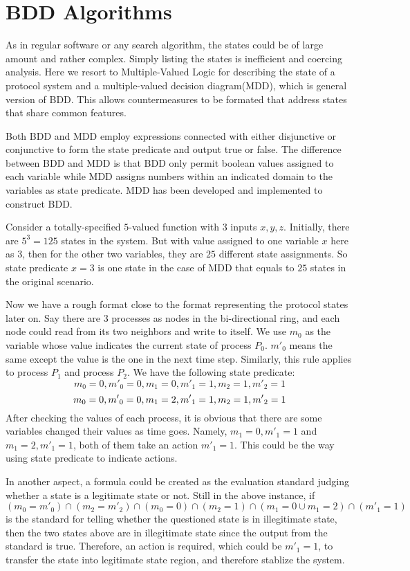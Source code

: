 \section{BDD Algorithms}
As in regular software or any search algorithm, the states could be of large amount and rather complex. Simply listing the states is inefficient and coercing analysis. Here we resort to Multiple-Valued Logic for describing the state of a protocol system and a multiple-valued decision diagram(MDD), which is general version of BDD. This allows countermeasures to be formated that address states that share common features. 

Both BDD and MDD employ expressions connected with either disjunctive or conjunctive to form the state predicate and output true or false. The difference between BDD and MDD is that BDD only permit boolean values assigned to each variable while MDD assigns numbers within an indicated domain to the variables as state predicate. MDD has been developed and implemented to construct BDD. 

Consider a totally-specified $5$-valued function with $3$ inputs $x, y, z$. Initially, there are $5^3 = 125$ states in the system. But with value assigned to one variable $x$ here as $3$, then for the other two variables, they are $25$ different state assignments. So state predicate $x=3$ is one state in the case of MDD that equals to $25$ states in the original scenario. 

Now we have a rough format close to the format representing the protocol states later on. Say there are 3 processes as nodes in the bi-directional ring, and each node could read from its two neighbors and write to itself. We use $m_0$ as the variable whose value indicates the current state of process $P_0$. ${m'}_0$ means the same except the value is the one in the next time step. Similarly, this rule applies to process $P_1$ and process $P_2$. We have the following state predicate:
\[
    m_0 = 0, {m'}_0 = 0, m_1 = 0, {m'}_1 = 1, m_2 = 1, {m'}_2 = 1
\]
\[
    m_0 = 0, {m'}_0 = 0, m_1 = 2, {m'}_1 = 1, m_2 = 1, {m'}_2 = 1\\
\]
After checking the values of each process, it is obvious that there are some variables changed their values as time goes. Namely, $m_1 = 0, {m'}_1 = 1$ and $m_1 = 2, {m'}_1 = 1$, both of them take an action ${m'}_1 = 1$. This could be the way using state predicate to indicate actions.

In another aspect, a formula could be created as the evaluation standard judging whether a state is a legitimate state or not. Still in the above instance, if $(m_0={m'}_0)\cap (m_2={m'}_2)\cap (m_0=0)\cap (m_2=1)\cap (m_1=0\cup m_1=2)\cap ({m'}_1=1)$ is the standard for telling whether the questioned state is in illegitimate state, then the two states above are in illegitimate state since the output from the standard is true. Therefore, an action is required, which could be ${m'}_1=1$, to transfer the state into legitimate state region, and therefore stablize the system.

